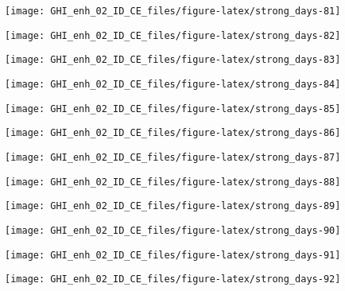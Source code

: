 \documentclass[
  10pt,
  a4paper,oneside]{article}
\begin{document}
\begin{center}\texttt{[image: GHI\_enh\_02\_ID\_CE\_files/figure-latex/strong\_days-81]} \end{center}

\begin{center}\texttt{[image: GHI\_enh\_02\_ID\_CE\_files/figure-latex/strong\_days-82]} \end{center}

\begin{center}\texttt{[image: GHI\_enh\_02\_ID\_CE\_files/figure-latex/strong\_days-83]} \end{center}

\begin{center}\texttt{[image: GHI\_enh\_02\_ID\_CE\_files/figure-latex/strong\_days-84]} \end{center}

\begin{center}\texttt{[image: GHI\_enh\_02\_ID\_CE\_files/figure-latex/strong\_days-85]} \end{center}

\begin{center}\texttt{[image: GHI\_enh\_02\_ID\_CE\_files/figure-latex/strong\_days-86]} \end{center}

\begin{center}\texttt{[image: GHI\_enh\_02\_ID\_CE\_files/figure-latex/strong\_days-87]} \end{center}

\begin{center}\texttt{[image: GHI\_enh\_02\_ID\_CE\_files/figure-latex/strong\_days-88]} \end{center}

\begin{center}\texttt{[image: GHI\_enh\_02\_ID\_CE\_files/figure-latex/strong\_days-89]} \end{center}

\begin{center}\texttt{[image: GHI\_enh\_02\_ID\_CE\_files/figure-latex/strong\_days-90]} \end{center}

\begin{center}\texttt{[image: GHI\_enh\_02\_ID\_CE\_files/figure-latex/strong\_days-91]} \end{center}

\begin{center}\texttt{[image: GHI\_enh\_02\_ID\_CE\_files/figure-latex/strong\_days-92]} \end{center}
\end{document}
